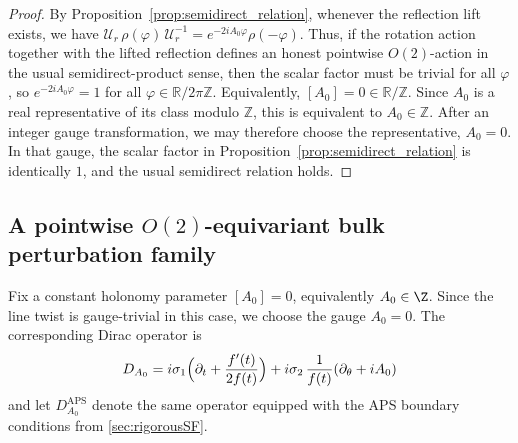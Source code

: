 \documentclass[11pt]{article}
\theoremstyle{definition}
\DeclareMathOperator{\APS}{APS}
\numberwithin{equation}{section}
\begin{document}
\begin{proof}
By Proposition~\ref{prop:semidirect_relation}, whenever the reflection lift exists, we have \(\mathcal{U}_r\,\rho(\varphi)\,\mathcal{U}_r^{-1} = e^{-2iA_0\varphi}\rho(-\varphi)\).
Thus, if the rotation action together with the lifted reflection defines an honest
pointwise \(O(2)\)-action in the usual semidirect-product sense, then the scalar factor
must be trivial for all \(\varphi\), so \(e^{-2iA_0\varphi}=1\) for all \(\varphi\in \mathbb R/2\pi\mathbb Z\).
Equivalently, \([A_0]=0 \in \mathbb R/\mathbb Z\).
Since \(A_0\) is a real representative of its class modulo \(\mathbb Z\), this is equivalent to \(A_0\in\mathbb Z\).
After an integer gauge transformation, we may therefore choose the representative, \(A_0=0\).
In that gauge, the scalar factor in Proposition~\ref{prop:semidirect_relation} is identically \(1\),
and the usual semidirect relation holds.
\end{proof}





\subsection{A pointwise \texorpdfstring{$O(2)$}{O(2)}-equivariant bulk perturbation family} \label{subsec:O2_sf_family}


Fix a constant holonomy parameter \([A_0]=0\), equivalently \(A_0\in\Z\).
Since the line twist is gauge-trivial in this case, we choose the gauge \(A_0=0\).
The corresponding Dirac operator is 
\begin{equation}\label{eq:DA0_section6}
D_{A_0}
=
i\sigma_1\Bigl(\partial_t+\frac{f'(t)}{2f(t)}\Bigr)
+
i\sigma_2\,\frac{1}{f(t)}(\partial_\theta+iA_0)
\end{equation}
and let $D_{A_0}^{\APS}$ denote the same operator equipped with the APS boundary conditions from \autoref{sec:rigorousSF}.
\end{document}

